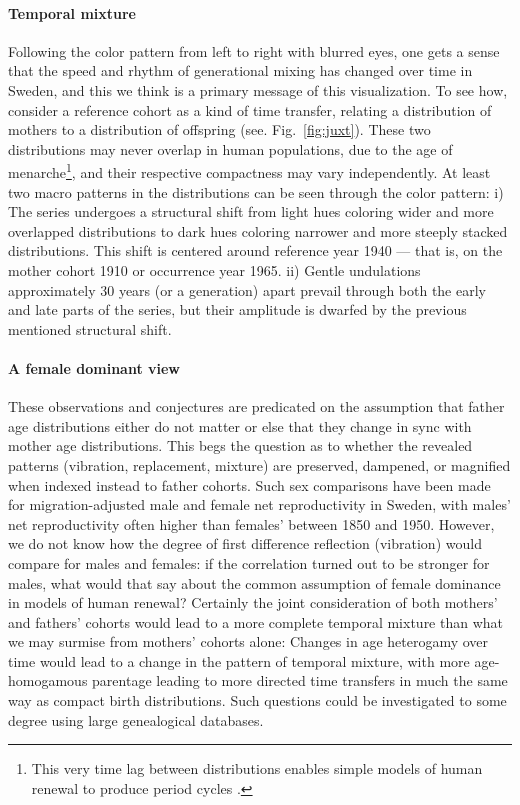 \paragraph{Temporal mixture}
Following the color pattern from left to right with blurred eyes, one gets a sense that the speed and rhythm of generational mixing has changed over time in Sweden, and this we think is a primary message of this visualization. To see how, consider a reference cohort as a kind of time transfer, relating a distribution of mothers to a distribution of offspring (see. Fig.~\ref{fig:juxt}). These two distributions may never overlap in human populations, due to the age of menarche\footnote{This very time lag between distributions enables simple models of human renewal to produce period cycles \citep{wachter1991pre}.}, and their respective compactness may vary independently. At least two macro patterns in the distributions can be seen through the color pattern: i) The series undergoes a structural shift from light hues coloring wider and more overlapped distributions to dark hues coloring narrower and more steeply stacked distributions. This shift is centered around reference year 1940 --- that is, on the mother cohort 1910 or occurrence year 1965. ii) Gentle undulations approximately 30 years (or a generation) apart prevail through both the early and late parts of the series, but their amplitude is dwarfed by the previous mentioned structural shift. 

\paragraph{A female dominant view}
These observations and conjectures are predicated on the assumption that father age distributions either do not matter or else that they change in sync with mother age distributions. This begs the question as to whether the revealed patterns (vibration, replacement, mixture) are preserved, dampened, or magnified when indexed instead to father cohorts. Such sex comparisons have been made for migration-adjusted male and female net reproductivity \citep{hyrenius1951reproduction} in Sweden, with males' net reproductivity often higher than females' between 1850 and 1950. However, we do not know how the degree of first difference reflection (vibration) would compare for males and females: if the correlation turned out to be stronger for males, what would that say about the common assumption of female dominance in models of human renewal? Certainly the joint consideration of both mothers' and fathers' cohorts would lead to a more complete temporal mixture than what we may surmise from mothers' cohorts alone: Changes in age heterogamy over time would lead to a change in the pattern of temporal mixture, with more age-homogamous parentage leading to more directed time transfers in much the same way as compact birth distributions. Such questions could be investigated to some degree using large genealogical databases.

